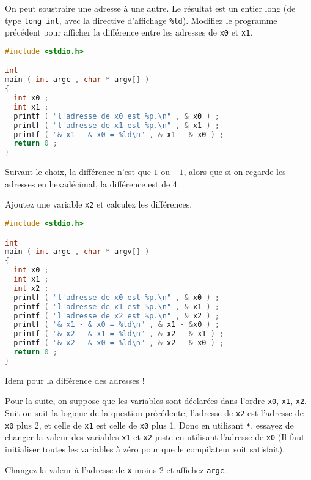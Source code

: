 \question On peut soustraire une adresse à une autre. Le résultat est
un entier long (de type \texttt{long int}, avec la directive
d'affichage \texttt{\%ld}). Modifiez le programme précédent pour
afficher la différence entre les adresses de \texttt{x0} et
\texttt{x1}.

\begin{solution}
  \begin{lstlisting}[language=C]
#include <stdio.h>

int
main ( int argc , char * argv[] )
{
  int x0 ;
  int x1 ;
  printf ( "l'adresse de x0 est %p.\n" , & x0 ) ;
  printf ( "l'adresse de x1 est %p.\n" , & x1 ) ;
  printf ( "& x1 - & x0 = %ld\n" , & x1 - & x0 ) ;
  return 0 ;
}
  \end{lstlisting}

  Suivant le choix, la différence n'est que \(1\) ou \(-1\), alors que si on
  regarde les adresses en hexadécimal, la différence est de 4.
\end{solution}

\question Ajoutez une variable \texttt{x2} et calculez les différences.


\begin{solution}
  \begin{lstlisting}[language=C]
#include <stdio.h>

int
main ( int argc , char * argv[] )
{
  int x0 ;
  int x1 ;
  int x2 ;
  printf ( "l'adresse de x0 est %p.\n" , & x0 ) ;
  printf ( "l'adresse de x1 est %p.\n" , & x1 ) ;
  printf ( "l'adresse de x2 est %p.\n" , & x2 ) ;
  printf ( "& x1 - & x0 = %ld\n" , & x1 - &x0 ) ;
  printf ( "& x2 - & x1 = %ld\n" , & x2 - & x1 ) ;
  printf ( "& x2 - & x0 = %ld\n" , & x2 - & x0 ) ;
  return 0 ;
}
  \end{lstlisting}
  Idem pour la différence des adresses !
\end{solution}

\question Pour la suite, on suppose que les variables sont déclarées
dans l'ordre \texttt{x0}, \texttt{x1}, \texttt{x2}. Suit on suit la
logique de la question précédente, l'adresse de \texttt{x2} est
l'adresse de \texttt{x0} plus 2, et celle de \texttt{x1} est celle de
\texttt{x0} plus 1. Donc en utilisant \texttt{*}, essayez de changer la
valeur des variables \texttt{x1} et \texttt{x2} juste en utilisant
l'adresse de \texttt{x0} (Il faut initialiser toutes les variables à
zéro pour que le compilateur soit satisfait).

\question Changez la valeur à l'adresse de \texttt{x} moins 2 et
affichez \texttt{argc}.

